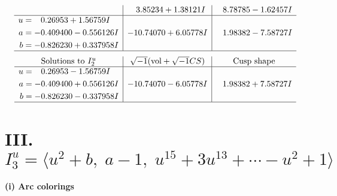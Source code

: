 \documentclass[1p]{elsarticle_modified}
\theoremstyle{definition}
\newcommand{\I}{\sqrt{-1}}
\begin{document}
$$\begin{array}{c|c|c}
 & \phantom{-}3.85234 + 1.38121 I & \phantom{-}8.78785 - 1.62457 I \\ \hline\begin{aligned}
u &= \phantom{-}0.26953 + 1.56759 I \\
a &= -0.409400 - 0.556126 I \\
b &= -0.826230 + 0.337958 I\end{aligned}
 & -10.74070 + 6.05778 I & \phantom{-}1.98382 - 7.58727 I\\
 \hline 
 \end{array}$$\newpage$$\begin{array}{c|c|c}  
\text{Solutions to }I^u_{2}& \I (\text{vol} + \sqrt{-1}CS) & \text{Cusp shape}\\
 \hline 
\begin{aligned}
u &= \phantom{-}0.26953 - 1.56759 I \\
a &= -0.409400 + 0.556126 I \\
b &= -0.826230 - 0.337958 I\end{aligned}
 & -10.74070 - 6.05778 I & \phantom{-}1.98382 + 7.58727 I\\
 \hline 
 \end{array}$$\newpage\newpage\renewcommand{\arraystretch}{1}
\centering \section*{III. $I^u_{3}= \langle u^2+b,\;a-1,\;u^{15}+3 u^{13}+\cdots- u^2+1 \rangle$}
\flushleft \textbf{(i) Arc colorings}\\
\end{document}
